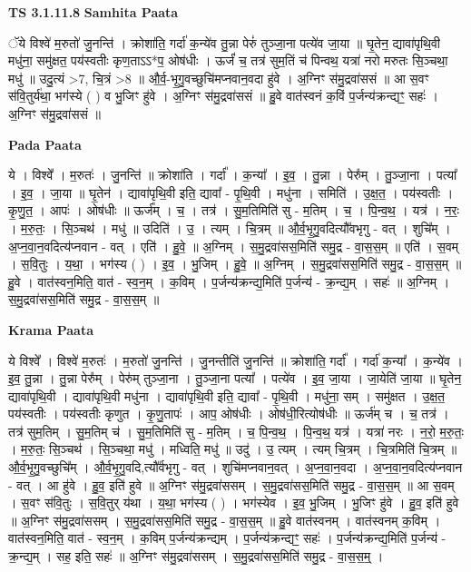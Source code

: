 \documentclass[17pt]{extarticle}
\begin{document}
\textbf{TS 3.1.11.8 } \newline
\textbf{Samhita Paata} \newline

ॅये विश्वे॑ म॒रुतो॑ जु॒नन्ति॑ । क्रोशा॑ति॒ गर्दा॑ क॒न्ये॑व तु॒न्ना पेरुं॑ तुञ्जा॒ना पत्ये॑व जा॒या ॥ घृ॒तेन॒ द्यावा॑पृथि॒वी मधु॑ना॒ समु॑क्षत॒ पय॑स्वतीः कृण॒ताऽऽ*प॒ ओष॑धीः । ऊर्जं॑ च॒ तत्र॑ सुम॒तिं च॑ पिन्वथ॒ यत्रा॑ नरो मरुतः सि॒ञ्चथा॒ मधु॑ ॥ उदु॒त्यं >7, चि॒त्रं >8 ॥ औ॒र्व॒-भृ॒गु॒वच्छुचि॑मप्नवान॒वदा हु॑वे । अ॒ग्निꣳ स॑मु॒द्रवा॑ससं ॥ आ स॒वꣳ स॑वि॒तुर्य॑था॒ भग॑स्ये ( ) व भु॒जिꣳ हु॑वे । अ॒ग्निꣳ स॑मु॒द्रवा॑ससं ॥ हु॒वे वात॑स्वनं क॒विं प॒र्जन्य॑क्रन्द्यꣳ॒॒ सहः॑ । अ॒ग्निꣳ स॑मु॒द्रवा॑ससं ॥ \newline

\textbf{Pada Paata} \newline

ये । विश्वे᳚ । म॒रुतः॑ । जु॒नन्ति॑ ॥ क्रोशा॑ति । गर्दा᳚ । क॒न्या᳚ । इ॒व॒ । तु॒न्ना । पेरु᳚म् । तु॒ञ्जा॒ना । पत्या᳚ । इ॒व॒ । जा॒या ॥ घृ॒तेन॑ । द्यावा॑पृथि॒वी इति॒ द्यावा᳚ - पृ॒थि॒वी । मधु॑ना । समिति॑ । उ॒क्ष॒त॒ । पय॑स्वतीः । कृ॒णु॒त॒ । आपः॑ । ओष॑धीः ॥ ऊर्ज᳚म् । च॒ । तत्र॑ । सु॒म॒तिमिति॑ सु - म॒तिम् । च॒ । पि॒न्व॒थ॒ । यत्र॑ । न॒रः॒ । म॒रु॒तः॒ । सि॒ञ्चथ॑ । मधु॑ ॥ उदिति॑ । उ॒ । त्यम् । चि॒त्रम् ॥ औ॒र्व॒भृ॒गु॒वदित्यौ᳚वभृगु - वत् । शुचि᳚म् । अ॒प्न॒वा॒न॒वदित्य॑प्नवान - वत् । एति॑ । हु॒वे॒ ॥ अ॒ग्निम् । स॒मु॒द्रवा॑सस॒मिति॑ समु॒द्र - वा॒स॒स॒म् ॥ एति॑ । स॒वम् । स॒वि॒तुः । य॒था॒ । भग॑स्य ( ) । इ॒व॒ । भु॒जिम् । हु॒वे॒ ॥ अ॒ग्निम् । स॒मु॒द्रवा॑सस॒मिति॑ समु॒द्र - वा॒स॒स॒म् ॥ हु॒वे । वात॑स्वन॒मिति॒ वात॑ - स्व॒न॒म् । क॒विम् । प॒र्जन्य॑क्रन्द्य॒मिति॑ प॒र्जन्य॑ - क्र॒न्द्य॒म् । सहः॑ ॥ अ॒ग्निम् । स॒मु॒द्रवा॑सस॒मिति॑ समु॒द्र - वा॒स॒स॒म् ॥  \newline


\textbf{Krama Paata} \newline

ये विश्वे᳚ । विश्वे॑ म॒रुतः॑ । म॒रुतो॑ जु॒नन्ति॑ । जु॒नन्तीति॑ जु॒नन्ति॑ ॥ क्रोशा॑ति॒ गर्दा᳚ । गर्दा॑ क॒न्या᳚ । क॒न्ये॑व । इ॒व॒ तु॒न्ना । तु॒न्ना पेरु᳚म् । पेरु॑म् तुञ्जा॒ना । तु॒ञ्जा॒ना पत्या᳚ । पत्ये॑व । इ॒व॒ जा॒या । जा॒येति॑ जा॒या ॥ घृ॒तेन॒ द्यावा॑पृथि॒वी । द्यावा॑पृथि॒वी मधु॑ना । द्यावा॑पृथि॒वी इति॒ द्यावा᳚ - पृ॒थि॒वी । मधु॑ना॒ सम् । समु॑क्षत । उ॒क्ष॒त॒ पय॑स्वतीः । पय॑स्वतीः कृणुत । कृ॒णु॒तापः॑ । आप॒ ओष॑धीः । ओष॑धी॒रित्योष॑धीः ॥ ऊर्ज॑म् च । च॒ तत्र॑ । तत्र॑ सुम॒तिम् । सु॒म॒तिम् च॑ । सु॒म॒तिमिति॑ सु - म॒तिम् । च॒ पि॒न्व॒थ॒ । पि॒न्व॒थ॒ यत्र॑ । यत्रा॑ नरः । न॒रो॒ म॒रु॒तः॒ । म॒रु॒तः॒ सि॒ञ्चथ॑ । सि॒ञ्चथा॒ मधु॑ । मध्विति॒ मधु॑ ॥ उदु॑ । उ॒ त्यम् । त्यम् चि॒त्रम् । चि॒त्रमिति॑ चि॒त्रम् ॥ औ॒र्व॒भृ॒गु॒वच्छुचि᳚म् । औ॒र्व॒भृ॒गु॒वदि,त्यौ᳚र्वभृगु - वत् । शुचि॑मप्नवान॒वत् । अ॒प्न॒वा॒न॒वदा । अ॒प्न॒वा॒न॒वदित्य॑प्नवान - वत् । आ हु॑वे । हु॒व॒ इति॑ हुवे ॥ अ॒ग्निꣳ स॑मु॒द्रवा॑ससम् । स॒मु॒द्रवा॑सस॒मिति॑ समु॒द्र - वा॒स॒स॒म् ॥ आ स॒वम् । स॒वꣳ स॑वि॒तुः । स॒वि॒तुर् य॑था । य॒था॒ भग॑स्य ( ) । भग॑स्येव । इ॒व॒ भु॒जिम् । भु॒जिꣳ हु॑वे । हु॒व॒ इति॑ हुवे ॥ अ॒ग्निꣳ स॑मु॒द्रवा॑ससम् । स॒मु॒द्रवा॑सस॒मिति॑ समु॒द्र - वा॒स॒स॒म् ॥ हु॒वे वात॑स्वनम् । वात॑स्वनम् क॒विम् । वात॑स्वन॒मिति॒ वात॑ - स्व॒न॒म् । क॒विम् प॒र्जन्य॑क्रन्द्यम् । प॒र्जन्य॑क्रन्द्यꣳ॒॒ सहः॑ । प॒र्जन्य॑क्रन्द्य॒मिति॑ प॒र्जन्य॑ - क्र॒न्द्य॒म् । सह॒ इति॒ सहः॑ ॥ अ॒ग्निꣳ स॑मु॒द्रवा॑ससम् । स॒मु॒द्रवा॑सस॒मिति॑ समु॒द्र - वा॒स॒स॒म्॒ । \newline
\end{document}
